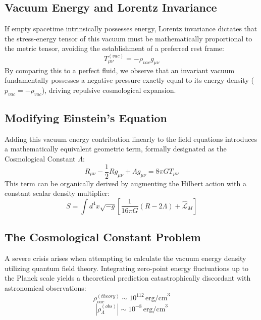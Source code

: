 \documentclass[11pt, a4paper]{report}
\begin{document}
\subsection{Vacuum Energy and Lorentz Invariance}
If empty spacetime intrinsically possesses energy, Lorentz invariance dictates that the stress-energy tensor of this vacuum must be mathematically proportional to the metric tensor, avoiding the establishment of a preferred rest frame:
\begin{equation}
\label{eq:vac_general}
T_{\mu\nu}^{(vac)} = -\rho_{vac} g_{\mu\nu}
\end{equation}
By comparing this to a perfect fluid, we observe that an invariant vacuum fundamentally possesses a negative pressure exactly equal to its energy density ($p_{vac} = -\rho_{vac}$), driving repulsive cosmological expansion.

\subsection{Modifying Einstein's Equation}
Adding this vacuum energy contribution linearly to the field equations introduces a mathematically equivalent geometric term, formally designated as the Cosmological Constant $\Lambda$:
\begin{equation}
\label{eq:einstein_lambda}
R_{\mu\nu} - \frac{1}{2}R g_{\mu\nu} + \Lambda g_{\mu\nu} = 8\pi G T_{\mu\nu}
\end{equation}
This term can be organically derived by augmenting the Hilbert action with a constant scalar density multiplier:
\begin{equation}
\label{eq:action_lambda}
S = \int d^4x \sqrt{-g} \left[ \frac{1}{16\pi G} (R - 2\Lambda) + \hat{\mathcal{L}}_M \right]
\end{equation}

\subsection{The Cosmological Constant Problem}
A severe crisis arises when attempting to calculate the vacuum energy density utilizing quantum field theory. Integrating zero-point energy fluctuations up to the Planck scale yields a theoretical prediction catastrophically discordant with astronomical observations:
\begin{equation}
\label{eq:theory_vac}
\rho_{vac}^{(theory)} \sim 10^{112} \, \text{erg/cm}^3
\end{equation}
\begin{equation}
\label{eq:obs_vac}
|\rho_{\Lambda}^{(obs)}| \sim 10^{-8} \, \text{erg/cm}^3
\end{equation}
\end{document}

